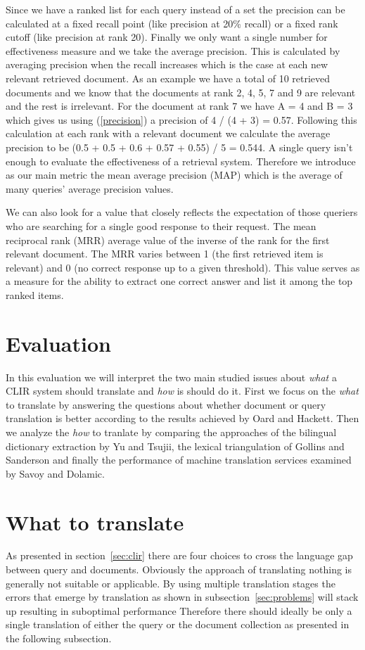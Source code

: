 \documentclass[journal]{IEEEtran}
\begin{document}
Since we have a ranked list for each query instead of a set the precision can be calculated at a fixed recall point (like precision at 20\% recall) or a fixed rank cutoff (like precision at rank 20).
Finally we only want a single number for effectiveness measure and we take the average precision.
This is calculated by averaging precision when the recall increases which is the case at each new relevant retrieved document.
As an example we have a total of 10 retrieved documents and we know that the documents at rank 2, 4, 5, 7 and 9 are relevant and the rest is irrelevant.
For the document at rank 7 we have A = 4 and B = 3 which gives us using (\ref{precision}) a precision of 4 / (4 + 3) = 0.57.
Following this calculation at each rank with a relevant document we calculate the average precision to be (0.5 + 0.5 + 0.6 + 0.57 + 0.55) / 5 = 0.544.
A single query isn't enough to evaluate the effectiveness of a retrieval system.
Therefore we introduce as our main metric the mean average precision (MAP) which is the average of many queries' average precision values.

We can also look for a value that closely reflects the expectation of those queriers who are searching for a single good response to their request.
The mean reciprocal rank (MRR) average value of the inverse of the rank for the first relevant document.
The MRR varies between 1 (the first retrieved item is relevant) and 0 (no correct response up to a given threshold).
This value serves as a measure for the ability to extract one correct answer and list it among the top ranked items.


\section{Evaluation}
In this evaluation we will interpret the two main studied issues about \textit{what} a CLIR system should translate and \textit{how} is should do it.
First we focus on the \textit{what} to translate by answering the questions about whether document or query translation is better according to the results achieved by Oard and Hackett.
Then we analyze the \textit{how} to tranlate by comparing the approaches of the bilingual dictionary extraction by Yu and Tsujii, the lexical triangulation of Gollins and Sanderson and finally the performance of machine translation services examined by Savoy and Dolamic.

\section*{What to translate}
As presented in section~\ref{sec:clir} there are four choices to cross the language gap between query and documents.
Obviously the approach of translating nothing is generally not suitable or applicable.
By using multiple translation stages the errors that emerge by translation as shown in subsection~\ref{sec:problems} will stack up resulting in suboptimal performance
Therefore there should ideally be only a single translation of either the query or the document collection as presented in the following subsection.
\end{document}
